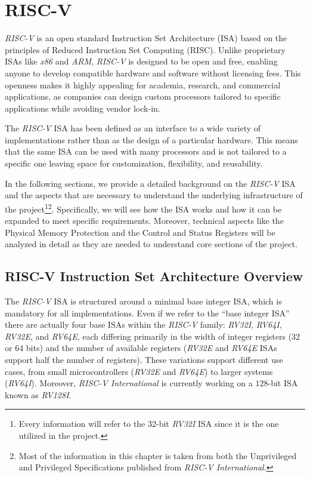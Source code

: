 \chapter{RISC-V}
\label{cha:riscv}

\textit{RISC-V} is an open standard Instruction Set Architecture (ISA) based on the
principles of Reduced Instruction Set Computing (RISC). Unlike proprietary ISAs
like \textit{x86} and \textit{ARM}, \textit{RISC-V} is designed to be open and
free, enabling anyone to develop compatible hardware and software without licensing
fees. This openness makes it highly appealing for academia, research, and
commercial applications, as companies can design custom processors tailored to specific
applications while avoiding vendor lock-in.

The \textit{RISC-V} ISA has been defined as an interface to a wide variety of
implementations rather than as the design of a particular hardware. This means that
the same ISA can be used with many processors and is not tailored to a specific one
leaving space for customization, flexibility, and reusability.

In the following sections, we provide a detailed background on the \textit{RISC-V}
ISA and the aspects that are necessary to understand the underlying infrastructure
of the project\footnote{Every information will refer to the $32$-bit \textit{RV32I}
ISA since it is the one utilized in the project.}\footnote{Most of the
information in this chapter is taken from both the Unprivileged and Privileged
Specifications\cite{specifications} published from \textit{RISC-V International}.}.
Specifically, we will see how the ISA works and how it can be expanded to meet specific
requirements. Moreover, technical aspects like the Physical Memory Protection and
the Control and Status Registers will be analyzed in detail as they are needed to
understand core sections of the project.

\section{RISC-V Instruction Set Architecture Overview}
\label{sec:riscv_isa}

The \textit{RISC-V} ISA is structured around a minimal base integer ISA, which
is mandatory for all implementations. Even if we refer to the ``base integer ISA''
there are actually four base ISAs within the \textit{RISC-V} family: \textit{RV32I},
\textit{RV64I}, \textit{RV32E}, and \textit{RV64E}, each differing primarily in the
width of integer registers ($32$ or $64$ bits) and the number of available registers
(\textit{RV32E} and \textit{RV64E} ISAs support half the number of registers).
These variations support different use cases, from small microcontrollers (\textit{RV32E}
and \textit{RV64E}) to larger systems (\textit{RV64I}). Moreover, \textit{RISC-V
International} is currently working on a $128$-bit ISA known as \textit{RV128I}.


